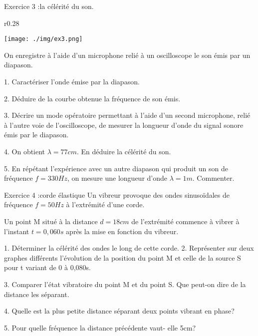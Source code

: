 \documentclass[12pt, french]{article}
\begin{document}
\begin{Box2}{Exercice 3 :la célérité du son. }
\begin{wrapfigure}{r}{0.28\textwidth}
  \begin{center}
	  \vspace{-0.8cm}
	\texttt{[image: ./img/ex3.png]}
  \end{center}
\end{wrapfigure}
On enregistre à l'aide d'un microphone relié à un oscilloscope le son émis par un
diapason.

1. Caractériser l'onde émise par la diapason.

2. Déduire de la courbe obtenue la fréquence de
son émis.

3. Décrire un mode opératoire permettant à
l'aide d'un second microphone, relié à l'autre
voie de l'oscilloscope, de mesurer la longueur
d'onde du signal sonore émis par le diapason.

4. On obtient $\lambda = 77 cm$. En déduire la
célérité du son.

5. En répétant l'expérience avec un autre
diapason qui produit un son de fréquence
$f = 330 Hz$, on mesure une longueur d'onde
$\lambda= 1m$. Commenter.

\end{Box2}

\begin{Box2}{Exercice 4 :corde élastique }
	Un vibreur provoque des ondes sinusoïdales de fréquence $f=50Hz$ à l'extrémité d'une corde. 

	Un point M situé à la distance $d=18cm$ de l'extrémité commence à vibrer à l'instant $t=0,060s$ après la mise en fonction du vibreur.

1. Déterminer la célérité des ondes le long de cette corde.
2. Représenter sur deux graphes différents l'évolution de la position du point M et celle de la source S pour t
variant de 0 à 0,080s.

3. Comparer l'état vibratoire du point M et du point S. Que peut-on dire de la distance les séparant.

4. Quelle est la plus petite distance séparant deux points vibrant en phase?

5. Pour quelle fréquence la distance précédente vaut- elle 5cm?
\end{Box2}
\end{document}
